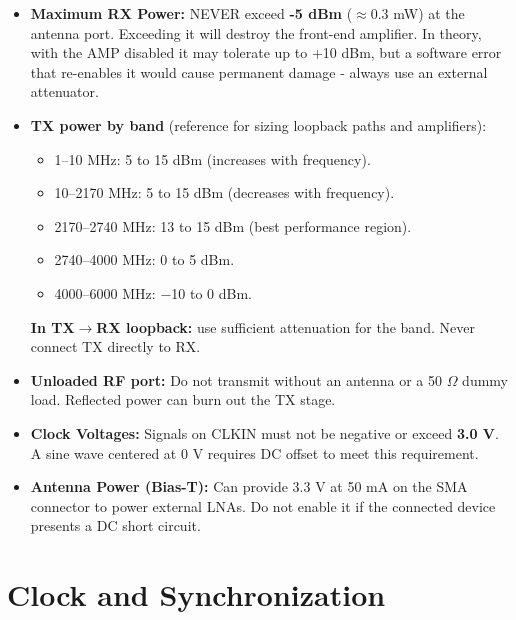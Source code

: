 \documentclass[11pt]{article}
\begin{document}
\vspace{4pt}
\begin{itemize}
    \item \textbf{Maximum RX Power:} NEVER exceed \textbf{-5 dBm} ($\approx$0.3 mW) at the antenna port. Exceeding it will destroy the front-end amplifier. In theory, with the AMP disabled it may tolerate up to +10 dBm, but a software error that re-enables it would cause permanent damage - always use an external attenuator.
    \item \textbf{TX power by band} (reference for sizing loopback paths and amplifiers):
    \begin{itemize}
        \item 1--10 MHz: 5 to 15 dBm (increases with frequency).
        \item 10--2170 MHz: 5 to 15 dBm (decreases with frequency).
        \item 2170--2740 MHz: 13 to 15 dBm (best performance region).
        \item 2740--4000 MHz: 0 to 5 dBm.
        \item 4000--6000 MHz: $-$10 to 0 dBm.
    \end{itemize}
    \textbf{In TX$\to$RX loopback:} use sufficient attenuation for the band. Never connect TX directly to RX.
    \item \textbf{Unloaded RF port:} Do not transmit without an antenna or a 50 $\Omega$ dummy load. Reflected power can burn out the TX stage.
    \item \textbf{Clock Voltages:} Signals on CLKIN must not be negative or exceed \textbf{3.0 V}. A sine wave centered at 0 V requires DC offset to meet this requirement.
    \item \textbf{Antenna Power (Bias-T):} Can provide 3.3 V at 50 mA on the SMA connector to power external LNAs. Do not enable it if the connected device presents a DC short circuit.
\end{itemize}

\section{Clock and Synchronization}
\end{document}

